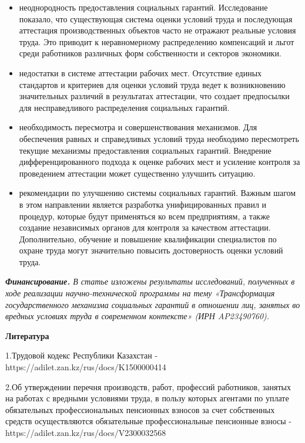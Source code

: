 \begin{itemize}
\item
  неоднородность предоставления социальных гарантий. Исследование
  показало, что существующая система оценки условий труда и последующая
  аттестация производственных объектов часто не отражают реальные
  условия труда. Это приводит к неравномерному распределению компенсаций
  и льгот среди работников различных форм собственности и секторов
  экономики.
\item
  недостатки в системе аттестации рабочих мест. Отсутствие единых
  стандартов и критериев для оценки условий труда ведет к возникновению
  значительных различий в результатах аттестации, что создает
  предпосылки для несправедливого распределения социальных гарантий.
\item
  необходимость пересмотра и совершенствования механизмов. Для
  обеспечения равных и справедливых условий труда необходимо
  пересмотреть текущие механизмы предоставления социальных гарантий.
  Внедрение дифференцированного подхода к оценке рабочих мест и усиление
  контроля за проведением аттестации может существенно улучшить
  ситуацию.
\item
  рекомендации по улучшению системы социальных гарантий. Важным шагом в
  этом направлении является разработка унифицированных правил и
  процедур, которые будут применяться ко всем предприятиям, а также
  создание независимых органов для контроля за качеством аттестации.
  Дополнительно, обучение и повышение квалификации специалистов по
  охране труда могут значительно повысить достоверность оценки условий
  труда.
\end{itemize}

\emph{{\bfseries Финансирование.} В статье изложены результаты
исследований, полученных в ходе реализации научно-технической программы
на тему «Трансформация государственного механизма социальных гарантий в
отношении лиц, занятых во вредных условиях труда в современном
контексте» (ИРН AP23490760).}

{\bfseries Литература}

1.Трудовой кодекс Республики Казахстан -
https://adilet.zan.kz/rus/docs/K1500000414

2.Об утверждении перечня производств, работ, профессий работников,
занятых на работах с вредными условиями труда, в пользу которых агентами
по уплате обязательных профессиональных пенсионных взносов за счет
собственных средств осуществляются обязательные профессиональные
пенсионные взносы - https://adilet.zan.kz/rus/docs/V2300032568


